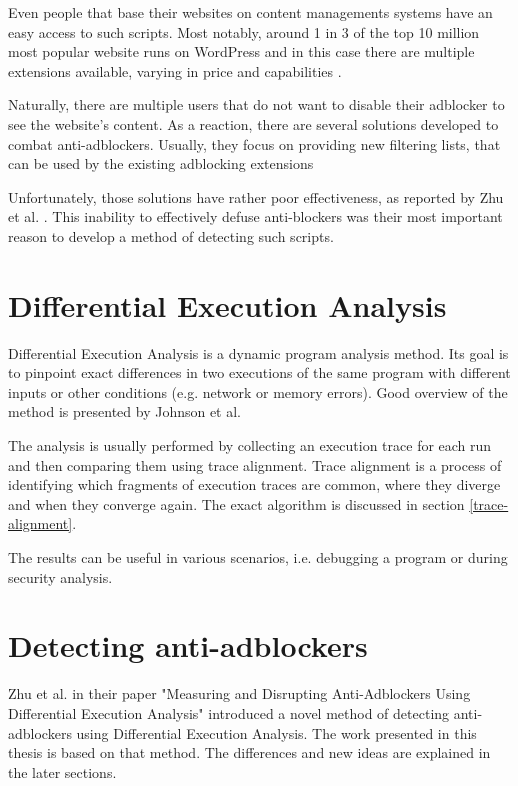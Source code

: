 Even people that base their websites on content managements systems have an easy access to such
scripts. Most notably, around 1 in 3 of the top 10 million most popular website runs on WordPress \cite{wiki:wordpress}
and in this case there are multiple extensions available, varying in price and capabilities \cite{wordpress:antiadblockers}.

Naturally, there are multiple users that do not want to disable their adblocker to see the website's content.
As a reaction, there are several solutions developed to combat anti-adblockers.
Usually, they focus on providing new filtering lists, that can be used by the existing adblocking extensions
\cite{anti-adblock-killer, nano-defender}

Unfortunately, those solutions have rather poor effectiveness, as reported by Zhu et al. \cite{DBLP:conf/ndss/ZhuHQSY18}.
This inability to effectively defuse anti-blockers was their most important reason to develop a method of detecting such scripts.


\section{Differential Execution Analysis}

Differential Execution Analysis is a dynamic program analysis method. Its goal is to pinpoint exact differences
in two executions of the same program with different inputs or other conditions (e.g. network or memory errors).
Good overview of the method is presented by Johnson et al. \cite{ieee:alignment-and-slicing}

The analysis is usually performed by collecting an execution trace for each run and then comparing
them using trace alignment. Trace alignment is a process of identifying which fragments of execution traces
are common, where they diverge and when they converge again. The exact algorithm is discussed in section \ref{trace-alignment}.

The results can be useful in various scenarios, i.e. debugging a program or during security analysis.


\section{Detecting anti-adblockers}

Zhu et al. in their paper "Measuring and Disrupting Anti-Adblockers Using Differential Execution Analysis" 
 \cite{DBLP:conf/ndss/ZhuHQSY18} introduced a novel method of detecting anti-adblockers
using Differential Execution Analysis. The work presented in this thesis is based on that method. 
The differences and new ideas are explained in the later sections.

